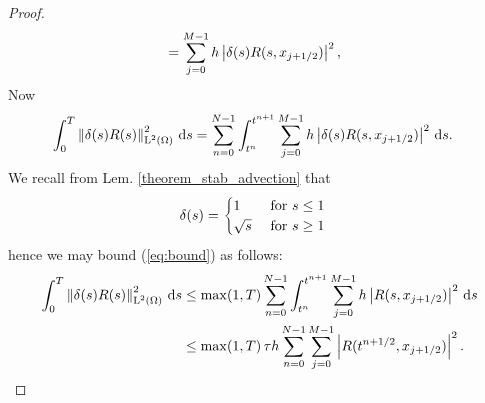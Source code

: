 \documentclass[final]{amsart}
\renewcommand{\d}{\ensuremath{\,\mathrm{d}}}
\numberwithin{equation}{section}
\begin{document}
\begin{proof}
\begin{equation}
\begin{split}
	&=
	\sum_{j=0}^{M-1} h \left|\delta(s) R(s, x_{j+1/2})\right|^2,
	\end{split}
	\end{equation}
	Now
	\begin{equation}\label{eq:bound}
	\begin{split}
	\int_0^T \Norm{\delta(s) R(s)}_{\leb{2}(\W)}^2 \d s
	&=
	\sum_{n=0}^{N-1} \int_{t^n}^{t^{n+1}}
	\sum_{j=0}^{M-1} h \norm{\delta(s) R(s, x_{j+1/2})}^2 \d s
	.
	\end{split}
	\end{equation}
	We recall from Lem.  \ref{theorem_stab_advection} that 
	\begin{equation}
	\begin{aligned}
	\delta\!\left({s}\right)&=\begin{cases}
	1 &\text{ for } s\leq 1\\
	\sqrt{s} &\text{ for } s\geq 1\\
	\end{cases}
	\end{aligned}
	\end{equation}
	hence we may bound (\ref{eq:bound}) as follows:
	\begin{equation}\label{eq:bound_2   }
	\begin{split}
	\int_0^T \Norm{\delta(s) R(s)}_{\leb{2}(\W)}^2 \d s
	&\leq
	\max\qp{1,{T}}
	\sum_{n=0}^{N-1} \int_{t^n}^{t^{n+1}}
	\sum_{j=0}^{M-1} h \norm{R(s, x_{j+1/2})}^2 \d s
	\\
	&\leq
	\max\qp{1,{T}}\tau h \sum_{n=0}^{N-1}
	\sum_{j=0}^{M-1} \norm{R(t^{n+1/2}, x_{j+1/2})}^2
	.
	\end{split}
	\end{equation}
	

\end{proof}
\end{document}
